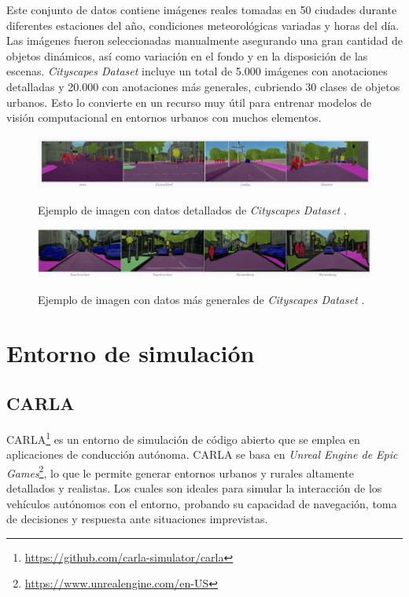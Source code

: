 Este conjunto de datos contiene imágenes reales tomadas en 50 ciudades durante diferentes estaciones del año, condiciones meteorológicas variadas y horas del día. Las imágenes fueron seleccionadas manualmente asegurando una gran cantidad de objetos dinámicos, así como variación en el fondo y en la disposición de las escenas. \textit{Cityscapes Dataset} incluye un total de 5.000 imágenes con anotaciones detalladas y 20.000 con anotaciones más generales, cubriendo 30 clases de objetos urbanos. Esto lo convierte en un recurso muy útil para entrenar modelos de visión computacional en entornos urbanos con muchos elementos.
\begin{figure}[ht]
\begin{center}
\includegraphics[width=15cm]{figs/Plataformas_Desarollo/detallado-ef.png}
\caption{Ejemplo de imagen con datos detallados de \textit{Cityscapes Dataset} \cite{cityscapes}.}
\label{foto_ef_detallado}
\vspace{0.5cm} %
\includegraphics[width=15cm]{figs/Plataformas_Desarollo/no_detallado_ef.png}
\caption{Ejemplo de imagen con datos más generales de \textit{Cityscapes Dataset} \cite{cityscapes}.}
\label{foto_ef_general}
\end{center}
\end{figure}

\section{Entorno de simulación}
\label{sec:sim}
\subsection{CARLA}
\label{sec:carla}

CARLA\footnote{\url{https://github.com/carla-simulator/carla}} es un entorno de simulación de código abierto que se emplea en aplicaciones de conducción autónoma. CARLA se basa en \textit{Unreal Engine de Epic Games}\footnote{\url{https://www.unrealengine.com/en-US}}, lo que le permite generar entornos urbanos y rurales altamente detallados y realistas. Los cuales son ideales para simular la interacción de los vehículos autónomos con el entorno, probando su capacidad de navegación, toma de decisiones y respuesta ante situaciones imprevistas.

